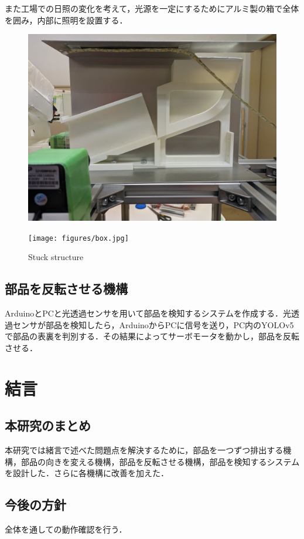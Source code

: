 \documentclass{classes/resume}
\begin{document}
    また工場での日照の変化を考えて，光源を一定にするためにアルミ製の箱で全体を囲み，内部に照明を設置する．


    \begin{figure}[htbp]
        \centering
        \begin{minipage}[t]{0.45\linewidth}
            \centering
            \includegraphics[width=0.9\linewidth]{figures/strip_box.jpg}
        \end{minipage}
        \begin{minipage}[t]{0.45\linewidth}
            \centering
            \texttt{[image: figures/box.jpg]}
        \end{minipage}
        \caption{Stuck structure}
        \label{fig:detectarea}
    \end{figure}
    \vspace*{-1\zh}

\subsection{部品を反転させる機構}

    ArduinoとPCと光透過センサを用いて部品を検知するシステムを作成する．光透過センサが部品を検知したら，ArduinoからPCに信号を送り，PC内のYOLOv5で部品の表裏を判別する．その結果によってサーボモータを動かし，部品を反転させる．

    \section{結言}
\subsection{本研究のまとめ}
    本研究では緒言で述べた問題点を解決するために，部品を一つずつ排出する機構，部品の向きを変える機構，部品を反転させる機構，部品を検知するシステムを設計した．さらに各機構に改善を加えた．
\subsection{今後の方針}
    全体を通しての動作確認を行う．

    
\end{document}
